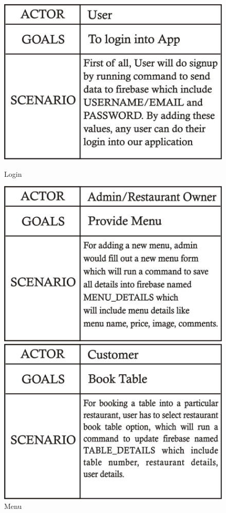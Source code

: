 \documentclass[12pt]{article}
\begin{document}
\begin{figure}
\centering
\includegraphics[scale=0.4]{login.jpeg}
\caption{Login}
\includegraphics[scale=0.4]{menue.jpeg}
\caption{Menu}
\includegraphics[scale=0.4]{booktabel.jpeg}

\end{figure}
\end{document}
